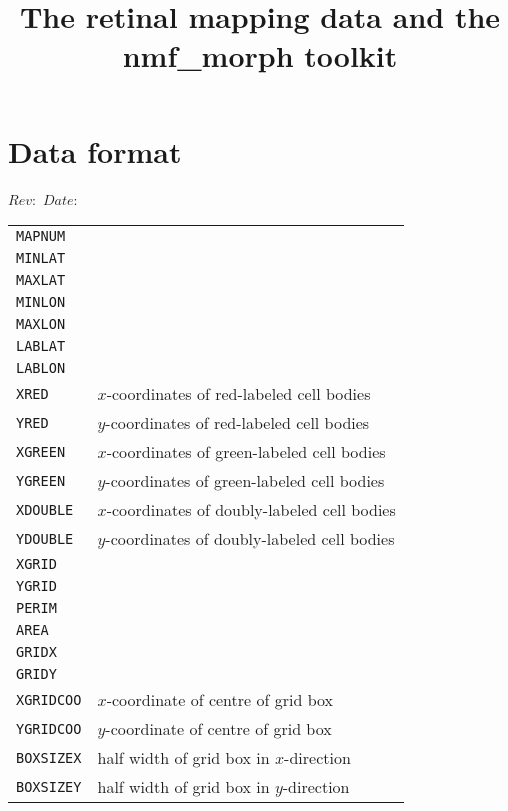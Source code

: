 \documentclass{article}
\title{The retinal mapping data and the nmf\_morph toolkit}
\begin{document}
\maketitle

\section{Data format}
\label{manual:sec:reading-data}

$Rev:$ $Date:$

\begin{table}
  \begin{tabular}{ll}
    \texttt{MAPNUM}   & \\  
    \texttt{MINLAT}   & \\
    \texttt{MAXLAT}   & \\
    \texttt{MINLON}   & \\
    \texttt{MAXLON}   & \\
    \texttt{LABLAT}   & \\
    \texttt{LABLON}   & \\
    \texttt{XRED}     & $x$-coordinates of red-labeled cell bodies    \\
    \texttt{YRED}     & $y$-coordinates of red-labeled cell bodies    \\
    \texttt{XGREEN}   & $x$-coordinates of green-labeled cell bodies  \\
    \texttt{YGREEN}   & $y$-coordinates of green-labeled cell bodies  \\
    \texttt{XDOUBLE}  & $x$-coordinates of doubly-labeled cell bodies \\ 
    \texttt{YDOUBLE}  & $y$-coordinates of doubly-labeled cell bodies \\
    \texttt{XGRID}    & \\
    \texttt{YGRID}    & \\
    \texttt{PERIM}    & \\
    \texttt{AREA}     & \\
    \texttt{GRIDX}    & \\
    \texttt{GRIDY}    & \\
    \texttt{XGRIDCOO} & $x$-coordinate of centre of grid box \\
    \texttt{YGRIDCOO} & $y$-coordinate of centre of grid box \\
    \texttt{BOXSIZEX} & half width of grid box in $x$-direction \\
    \texttt{BOXSIZEY} & half width of grid box in $y$-direction \\

\end{tabular}
\end{table}
\end{document}
